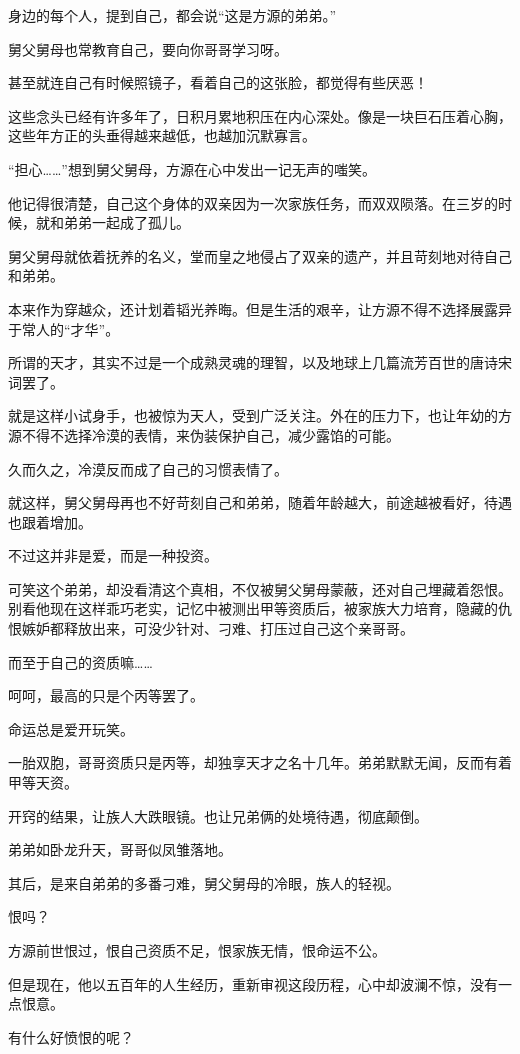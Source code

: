 \begin{this_body}
身边的每个人，提到自己，都会说“这是方源的弟弟。”

舅父舅母也常教育自己，要向你哥哥学习呀。

甚至就连自己有时候照镜子，看着自己的这张脸，都觉得有些厌恶！

这些念头已经有许多年了，日积月累地积压在内心深处。像是一块巨石压着心胸，这些年方正的头垂得越来越低，也越加沉默寡言。

“担心……”想到舅父舅母，方源在心中发出一记无声的嗤笑。

他记得很清楚，自己这个身体的双亲因为一次家族任务，而双双陨落。在三岁的时候，就和弟弟一起成了孤儿。

舅父舅母就依着抚养的名义，堂而皇之地侵占了双亲的遗产，并且苛刻地对待自己和弟弟。

本来作为穿越众，还计划着韬光养晦。但是生活的艰辛，让方源不得不选择展露异于常人的“才华”。

所谓的天才，其实不过是一个成熟灵魂的理智，以及地球上几篇流芳百世的唐诗宋词罢了。

就是这样小试身手，也被惊为天人，受到广泛关注。外在的压力下，也让年幼的方源不得不选择冷漠的表情，来伪装保护自己，减少露馅的可能。

久而久之，冷漠反而成了自己的习惯表情了。

就这样，舅父舅母再也不好苛刻自己和弟弟，随着年龄越大，前途越被看好，待遇也跟着增加。

不过这并非是爱，而是一种投资。

可笑这个弟弟，却没看清这个真相，不仅被舅父舅母蒙蔽，还对自己埋藏着怨恨。别看他现在这样乖巧老实，记忆中被测出甲等资质后，被家族大力培育，隐藏的仇恨嫉妒都释放出来，可没少针对、刁难、打压过自己这个亲哥哥。

而至于自己的资质嘛……

呵呵，最高的只是个丙等罢了。

命运总是爱开玩笑。

一胎双胞，哥哥资质只是丙等，却独享天才之名十几年。弟弟默默无闻，反而有着甲等天资。

开窍的结果，让族人大跌眼镜。也让兄弟俩的处境待遇，彻底颠倒。

弟弟如卧龙升天，哥哥似凤雏落地。

其后，是来自弟弟的多番刁难，舅父舅母的冷眼，族人的轻视。

恨吗？

方源前世恨过，恨自己资质不足，恨家族无情，恨命运不公。

但是现在，他以五百年的人生经历，重新审视这段历程，心中却波澜不惊，没有一点恨意。

有什么好愤恨的呢？


\end{this_body}
